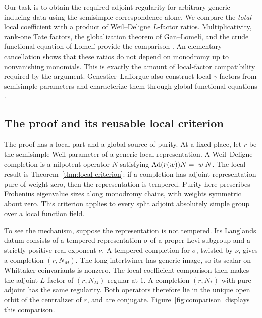Our task is to obtain the required adjoint regularity for arbitrary
generic inducing data using the semisimple correspondence alone.
We compare the \emph{total} local coefficient with a product of
Weil--Deligne $L$-factor ratios. Multiplicativity, rank-one Tate
factors, the globalization theorem of Gan--Lomel\'i, and the crude
functional equation of Lomel\'i provide the comparison
\cite{GanLomeli,LomeliLS}. An elementary cancellation shows that
these ratios do not depend on monodromy up to nonvanishing monomials.
This is exactly the amount of local-factor compatibility required
by the argument. Genestier--Lafforgue also construct local $\gamma$-factors
from semisimple parameters and characterize them through global
functional equations \cite[Section~7]{GenestierLafforgue}.

\subsection{The proof and its reusable local criterion}

The proof has a local part and a global source of purity. At a fixed
place, let $r$ be the semisimple Weil parameter of a generic local
representation. A Weil--Deligne completion is a nilpotent operator
$N$ satisfying $\operatorname{Ad}(r(w))N=|w|N$. The local result is
Theorem~\ref{thm:local-criterion}: if a completion has adjoint
representation pure of weight zero, then the representation is
tempered. Purity here prescribes Frobenius eigenvalue sizes along
monodromy chains, with weights symmetric about zero. This criterion applies to every split adjoint absolutely
simple group over a local function field.

To see the mechanism, suppose the representation is not tempered.
Its Langlands datum consists of a tempered representation $\sigma$
of a proper Levi subgroup and a strictly positive real exponent
$\nu$. A tempered completion for $\sigma$, twisted by $\nu$, gives
a completion $(r,N_M)$. The long intertwiner has generic image, so
its scalar on Whittaker coinvariants is nonzero. The local-coefficient
comparison then makes the adjoint $L$-factor of $(r,N_M)$ regular at
$1$. A completion $(r,N_*)$ with pure adjoint has the same regularity. Both
operators therefore lie in the unique open orbit of the centralizer
of $r$, and are conjugate. Figure~\ref{fig:comparison} displays this
comparison.

